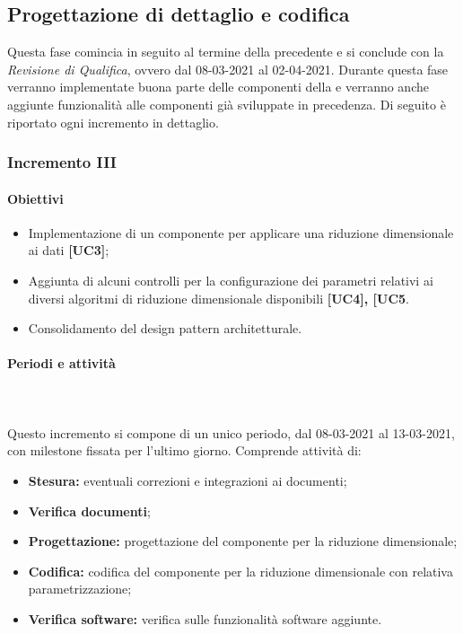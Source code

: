 \subsection{Progettazione di dettaglio e codifica}
Questa fase comincia in seguito al termine della precedente e si conclude con la \textit{Revisione di Qualifica}, ovvero dal 08-03-2021 al 02-04-2021. Durante questa fase verranno implementate buona parte delle componenti della  e verranno anche aggiunte funzionalità alle componenti già sviluppate in precedenza.
Di seguito è riportato ogni incremento in dettaglio.

\subsubsection{Incremento III} 

\paragraph{Obiettivi}
\begin{itemize}
\item Implementazione di un componente per applicare una riduzione dimensionale ai dati  \textbf{[UC3]};
\item Aggiunta di alcuni controlli per la configurazione dei parametri relativi ai diversi algoritmi di riduzione dimensionale disponibili \textbf{[UC4], [UC5}.
\item Consolidamento del design pattern architetturale.
\end{itemize}

\paragraph{Periodi e attività} \mbox{}\\\mbox{}\\
Questo incremento si compone di un unico periodo, dal 08-03-2021 al 13-03-2021, con milestone fissata per l'ultimo giorno. Comprende attività di:
\begin{itemize}
\item \textbf{Stesura:} eventuali correzioni e integrazioni ai documenti;
\item \textbf{Verifica documenti};
\item \textbf{Progettazione:} progettazione del componente per la riduzione dimensionale;
\item \textbf{Codifica:} codifica del componente per la riduzione dimensionale con relativa parametrizzazione;
\item \textbf{Verifica software:} verifica sulle funzionalità software aggiunte.
\end{itemize}

